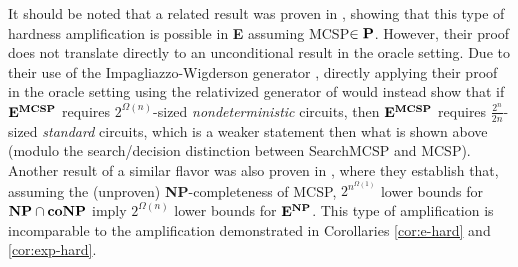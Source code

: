 \documentclass[11pt]{article}
\newcommand{\dash}{\text{-}}
\newcommand{\varbound}{\frac{2^n}{2n}}
\def\cl{\bf}
\begin{document}
It should be noted that a related result was proven in \cite{circuit-minimization}, showing that this type of hardness amplification is possible in {\cl E} assuming {\sc MCSP}$ \in {\cl P}$. However, their proof does not translate directly to an unconditional result in the oracle setting. Due to their use of the Impagliazzo-Wigderson generator \cite{IW}, directly applying their proof in the oracle setting using the relativized generator of \cite{AM-derandomization} would instead show that  if ${\cl E}^{\cl MCSP}$ requires $2^{\Omega(n)}$-sized \emph{nondeterministic} circuits, then ${\cl E}^{\cl MCSP}$ requires $\varbound$-sized \emph{standard} circuits, which is a weaker statement then what is shown above (modulo the search/decision distinction between {\sc Search\dash MCSP} and {\sc MCSP}). Another result of a similar flavor was also proven in \cite{Hitchcock-Pavan}, where they establish that, assuming the (unproven) {\cl NP}-completeness of {\sc MCSP}, $2^{n^{\Omega(1)}}$ lower bounds for ${\cl NP} \cap {\cl coNP}$ imply $2^{\Omega(n)}$ lower bounds for ${\cl E}^{\cl NP}$. This type of amplification is incomparable to the amplification demonstrated in Corollaries \ref{cor:e-hard} and \ref{cor:exp-hard}. 
\end{document}
